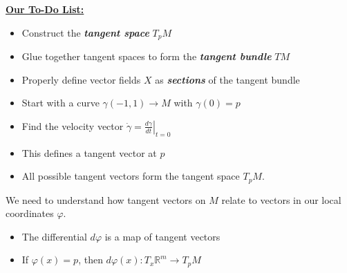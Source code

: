 \documentclass[UKenglish]{beamer}
\newcommand\boldgreen[1]{\textcolor{lighter_csu_green}{\emph{\textbf{#1}}}}
\newcommand{\R}{\mathbb{R}}
\begin{document}
\begin{frame}{}
\vfill
\textbf{\underline{Our To-Do List:}}
\begin{itemize}
	\item Construct the \boldgreen{tangent space} $T_pM$
	\pause
	\item Glue together tangent spaces to form the \boldgreen{tangent bundle} $TM$
	\pause
	\item Properly define vector fields $X$ as \boldgreen{sections} of the tangent bundle
\end{itemize}
\vfill
\end{frame}

\begin{frame}{}
	\vfill
	\begin{itemize}
		\item Start with a curve $\gamma (-1,1) \to M$ with $\gamma(0)=p$
		\pause
		\item Find the velocity vector $\dot{\gamma}=\left.\frac{d\gamma}{dt}\right\vert_{t=0}$
		\pause
		\item This defines a tangent vector at $p$
		\pause
		\item All possible tangent vectors form the tangent space $T_pM$.
	\end{itemize}
\end{frame}

\begin{frame}{}
\vfill
\begin{figure}[H]
	\centering
	\def\svgwidth{0.75\columnwidth}
	
\end{figure}
\vfill
\end{frame}

\begin{frame}{}
\vfill
\begin{figure}[H]
	\centering
	\def\svgwidth{0.75\columnwidth}
	
\end{figure}
\vfill
\end{frame}

\begin{frame}{}
	\vfill
	We need to understand how tangent vectors on $M$ relate to vectors in our local coordinates $\varphi$.
	\begin{itemize}
		\item The differential $d\varphi$ is a map of tangent vectors
		\pause
		\item If $\varphi(x)=p$, then $d\varphi(x) \colon T_x\R^m \to T_pM$
	\end{itemize}
	\vfill
\end{frame}
\end{document}
